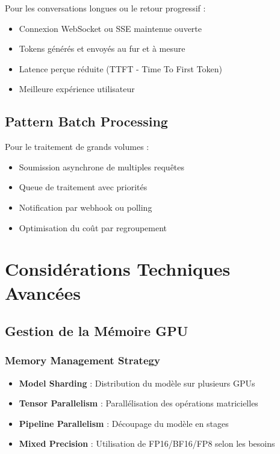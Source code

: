 \documentclass[12pt,a4paper]{article}
\begin{document}
Pour les conversations longues ou le retour progressif :
\begin{itemize}[noitemsep]
    \item Connexion WebSocket ou SSE maintenue ouverte
    \item Tokens générés et envoyés au fur et à mesure
    \item Latence perçue réduite (TTFT - Time To First Token)
    \item Meilleure expérience utilisateur
\end{itemize}

\subsection{Pattern Batch Processing}

Pour le traitement de grands volumes :
\begin{itemize}[noitemsep]
    \item Soumission asynchrone de multiples requêtes
    \item Queue de traitement avec priorités
    \item Notification par webhook ou polling
    \item Optimisation du coût par regroupement
\end{itemize}

\newpage
\section{Considérations Techniques Avancées}

\subsection{Gestion de la Mémoire GPU}

\subsubsection{Memory Management Strategy}
\begin{itemize}[leftmargin=2cm]
    \item \textbf{Model Sharding} : Distribution du modèle sur plusieurs GPUs
    \item \textbf{Tensor Parallelism} : Parallélisation des opérations matricielles
    \item \textbf{Pipeline Parallelism} : Découpage du modèle en stages
    \item \textbf{Mixed Precision} : Utilisation de FP16/BF16/FP8 selon les besoins
\end{itemize}
\end{document}
